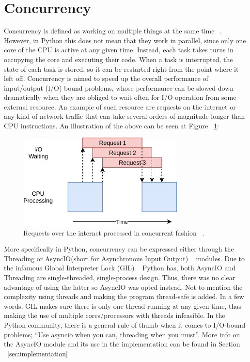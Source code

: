 \section{Concurrency}
Concurrency is defined as working on multiple things at the same time ~\cite{concurrency_realpython}. However, in Python this does not mean that they work in parallel, since only one core of the CPU is active at any given time. Instead, each task takes turns in occupying the core and executing their code. When a task is interrupted, the state of each task is stored, so it can be restarted right from the point where it left off. Concurrency is aimed to speed up the overall performance of input/output (I/O) bound problems, whose performance can be slowed down dramatically when they are obliged to wait often for I/O operation from some external resource. An example of such resource are requests on the internet or any kind of network traffic that can take several orders of magnitude longer than CPU instructions. An illustration of the above can be seen at Figure ~\ref{fig:concurrency_example}:

\begin{figure}[ht]
 \centering
 \includegraphics[width=3.3in]{figures/concurrency_example.png}
 \caption{Requests over the internet processed in concurrent fashion ~\cite{concurrency_realpython}.}
 \label{fig:concurrency_example}
\end{figure}

More specifically in Python, concurrency can be expressed either through the Threading or AsyncIO(short for Asynchronous Input Output) ~\cite{asyncio} modules. Due to the infamous Global Interpreter Lock (GIL) ~\cite{gil_realpython} Python has, both AsyncIO and Threading are single-threaded, single-process design. Thus, there was no clear advantage of using the latter so AsyncIO was opted instead. Not to mention the complexity using threads and making the program thread-safe is added. In a few words, GIL makes sure there is only one thread running at any given time, thus making the use of multiple cores/processors with threads infeasible. 
In the Python community, there is a general rule of thumb when it comes to I/O-bound problems; “Use asyncio when you can, threading when you must”.
More info on the AsyncIO module and its use in the \pname implementation can be found in Section ~\ref{sec:implementation}

